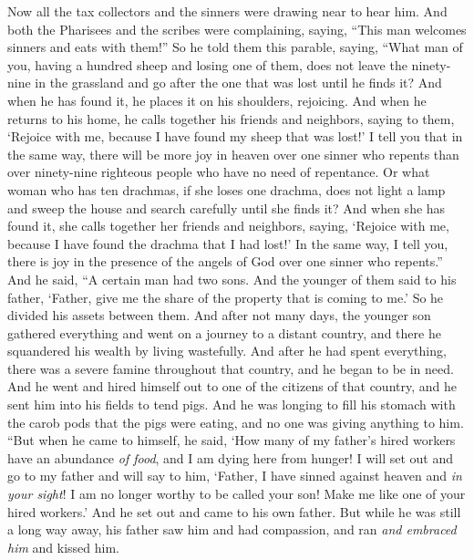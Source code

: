 \begin{biblechapter} %
 Now all the tax collectors and the sinners were drawing near to hear him.
\verse And both the Pharisees and the scribes were complaining, saying, “This man welcomes sinners and eats with them!”
\verse So he told them this parable, saying,
\verse “What man of you, having a hundred sheep and losing one of them, does not leave the ninety-nine in the grassland and go after the one that was lost until he finds it?
\verse And when he has found it, he places it on his shoulders, rejoicing.
\verse And when he returns to his home, he calls together his friends and neighbors, saying to them, ‘Rejoice with me, because I have found my sheep that was lost!’
\verse I tell you that in the same way, there will be more joy in heaven over one sinner who repents than over ninety-nine righteous people who have no need of repentance.
 Or what woman who has ten drachmas, if she loses one drachma, does not light a lamp and sweep the house and search carefully until she finds it?
\verse And when she has found it, she calls together her friends and neighbors, saying, ‘Rejoice with me, because I have found the drachma that I had lost!’
\verse In the same way, I tell you, there is joy in the presence of the angels of God over one sinner who repents.”
 And he said, “A certain man had two sons.
\verse And the younger of them said to his father, ‘Father, give me the share of the property that is coming to me.’ So he divided his assets between them.
\verse And after not many days, the younger son gathered everything and went on a journey to a distant country, and there he squandered his wealth by living wastefully.
\verse And after he had spent everything, there was a severe famine throughout that country, and he began to be in need.
\verse And he went and hired himself out to one of the citizens of that country, and he sent him into his fields to tend pigs.
\verse And he was longing to fill his stomach with the carob pods that the pigs were eating, and no one was giving anything to him.
\verse “But when he came to himself, he said, ‘How many of my father’s hired workers have an abundance \textit{of food}, and I am dying here from hunger!
\verse I will set out and go to my father and will say to him, ‘Father, I have sinned against heaven and \textit{in your sight}!
\verse I am no longer worthy to be called your son! Make me like one of your hired workers.’
\verse And he set out and came to his own father. But while he was still a long way away, his father saw him and had compassion, and ran \textit{and embraced him} and kissed him.

\end{biblechapter}
